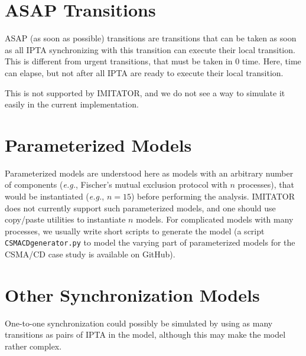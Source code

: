 \documentclass[a4paper,11pt]{report}
\makeatletter
\newcommand{\imitator}{\textsf{IMITATOR}}
\newcommand{\IPTA}{IPTA}
\newcommand{\stylePath}[1]{\textcolor{pathcolor}{\texttt{#1}}}
\newcommand{\GitHubIMI}{GitHub} %
\newcommand{\eg}{\textcolor{colorok}{\textit{e.g.},\@}}
\makeatother
\begin{document}



\section{ASAP Transitions}

ASAP (as soon as possible) transitions are transitions that can be taken as soon as all \IPTA{} synchronizing with this transition can execute their local transition.
This is different from urgent transitions, that must be taken in 0 time.
Here, time can elapse, but not after all \IPTA{} are ready to execute their local transition.

This is not supported by \imitator{}, and we do not see a way to simulate it easily in the current implementation.



\section{Parameterized Models}

Parameterized models are understood here as models with an arbitrary number of components (\eg{} Fischer's mutual exclusion protocol with $n$ processes), that would be instantiated (\eg{} $n = 15$) before performing the analysis.
\imitator{} does not currently support such parameterized models, and one should use copy/paste utilities to instantiate $n$ models.
For complicated models with many processes, we usually write short scripts to generate the model (a script \stylePath{CSMACDgenerator.py} to model the varying part of parameterized models for the CSMA/CD case study is available on \GitHubIMI{}).




\section{Other Synchronization Models}

One-to-one synchronization could possibly be simulated by using as many transitions as pairs of \IPTA{} in the model, although this may make the model rather complex.
\end{document}
